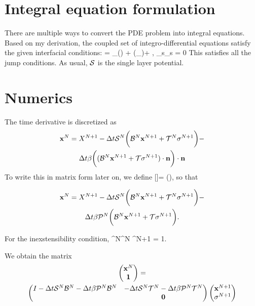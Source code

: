 \documentclass[aps,prl,twocolumn,showpacs]{revtex4}
\begin{document}
\section{Integral equation formulation}
There are multiple ways to convert the PDE problem into integral equations. Based on my derivation, the coupled set of integro-differential equations satisfy the given interfacial conditions:
\beq \dot{\mbx} = \mbu_\infty(\mbx) + \beta (\mbf_\cdot\mbn)\mbn + , \eeq
\beq \mbx_s\cdot\dot{\mbx}_s = 0 \eeq
This satisfies all the jump conditions. As usual, $\mathcal{S}$ is the single layer potential. 

\section{Numerics}
The time derivative is discretized as 
 \begin{multline}  \mathbf{x}^N = X^{N+1} - \Delta t\mathcal{S}^N\bigg(\mathcal{B}^N\mathbf{x}^{N+1}+\mathcal{T}^N\sigma^{N+1}\bigg) - \\ \Delta t\beta\bigg((\mathcal{B}^N\mathbf{x}^{N+1}+\mathcal{T}\sigma^{N+1})\cdot \mathbf{n} \bigg)\cdot \mathbf{n}
 \end{multline}
 To write this in matrix form later on, we define 
 \beq {} [\mbx]\mbf = \bigg(\mbf \cdot \mbn\bigg)\mbn, \eeq
 so that 

 \begin{multline}\mathbf{x}^N = X^{N+1} - \Delta t\mathcal{S}^N\bigg(\mathcal{B}^N\mathbf{x}^{N+1}+\mathcal{T}^N\sigma^{N+1}\bigg) - \\ \Delta t\beta \mathcal{P}^N\bigg(\mathcal{B}^N\mathbf{x}^{N+1}+\mathcal{T}\sigma^{N+1}\bigg). \end{multline}
 
 For the inexstensibility condition,
 \beq \dbl^N\mbx^N \cdot \dbl\mbx^{N+1} = 1. \eeq
 
 We obtain the matrix
\begin{multline}
 \begin{pmatrix}
 	\mathbf{x}^N \\ \textbf{1} 
 \end{pmatrix} = \\
\begin{pmatrix}
	I - \Delta t \mathcal{S}^N\mathcal{B}^N - \Delta t \beta \mathcal{P}^N\mathcal{B}^N & -\Delta t \mathcal{S}^N \mathcal{T}^N-\Delta t\beta \mathcal{P}^N\mathcal{T}^N \\ & \textbf{0}
\end{pmatrix}
\begin{pmatrix}
	\mathbf{x}^{N+1} \\ \sigma^{N+1}
\end{pmatrix} 
\end{multline}
\end{document}
